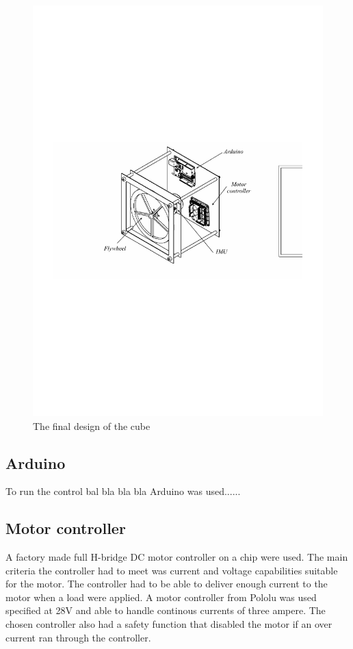 \documentclass[a4paper,11pt]{kth-mag}
\begin{document}
\begin{figure}[!htb]
\centering
\includegraphics[trim=5cm 10cm 5cm 9cm, clip=true,scale=.9]{Finaldesign.pdf}
\caption{The final design of the cube}
\label{Fig: final design}
\end{figure}

\subsection{Arduino}
To run the control bal bla bla bla Arduino was used......


\subsection{Motor controller}
A factory made full H-bridge DC motor controller on a chip were used. The main criteria the controller had to meet was current and voltage capabilities suitable for the motor. The controller had to be able to deliver enough current to the motor when a load were applied. A motor controller from Pololu was used specified at 28V and able to handle continous currents of three ampere. The chosen controller also had a safety function that disabled the motor if an over current ran through the controller.
\end{document}
